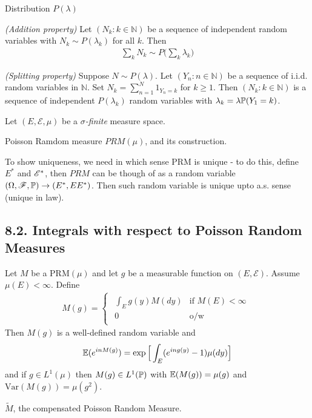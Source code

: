 \documentclass[10pt,a4paper]{report}
\begin{document}
Distribution $P(\lambda)$
\s

\emph{(Addition property)} Let $(N_k : k\in \mathbb{N})$ be a sequence of independent random variables with $N_k \sim P(\lambda_k)$ for all $k$. Then 
\begin{align*}
\sum_{k} N_k \sim P \big( \sum_k \lambda_k \big)
\end{align*}
\s

\emph{(Splitting property)} Suppose $N\sim P(\lambda)$. Let $(Y_n : n\in \mathbb{N})$ be a sequence of i.i.d. random variables in $\mathbb{N}$. Set $N_k = \sum_{n=1}^N 1_{Y_n =k}$ for $k\geq 1$. Then $(N_k : k\in \mathbb{N})$ is a sequence of independent $P(\lambda_k)$ random variables with $\lambda_k = \lambda \mathbb{P}(Y_1 =k)$.
\s

Let $(E, \mathscr{E}, \mu)$ be a \emph{$\sigma$-finite} measure space.

Poisson Ramdom measure $PRM(\mu)$, and its construction.
\s

To show uniqueness, we need in which sense PRM is unique - to do this, define $E^*$ and $\mathscr{E}^*$, then $PRM$ can be though of as a random variable $(\Omega, \mathscr{F}, \mathbb{P})  \rightarrow (E^*, EE^*)$. Then such random variable is unique upto a.s. sense (unique in law).


\subsection*{8.2. Integrals with respect to Poisson Random Measures}

 Let $M$ be a $\text{PRM}(\mu)$ and let $g$ be a measurable function on $(E, \mathscr{E})$. Assume $\mu(E) < \infty$. Define
\begin{align*}
M(g) = \begin{cases}
\begin{array}{ll}
\int_E g(y) M(dy) & \text{if  } M(E) < \infty \\
0 & \text{o/w}
\end{array}
\end{cases}
\end{align*}
Then $M(g)$ is a well-defined random variable and 
\begin{align*}
\mathbb{E}(e^{inM(g)}) = \exp \Big[ \int_E (e^{ing(y)} -1) \mu(dy) \Big]
\end{align*}
and if $g\in L^1(\mu)$ then $M(g) \in L^1(\mathbb{P})$ with $\mathbb{E}(M(g)) = \mu(g)$ and $\text{Var}(M(g)) = \mu(g^2)$.
\s

$\tilde{M}$, the compensated Poisson Random Measure. 
\s
\end{document}
